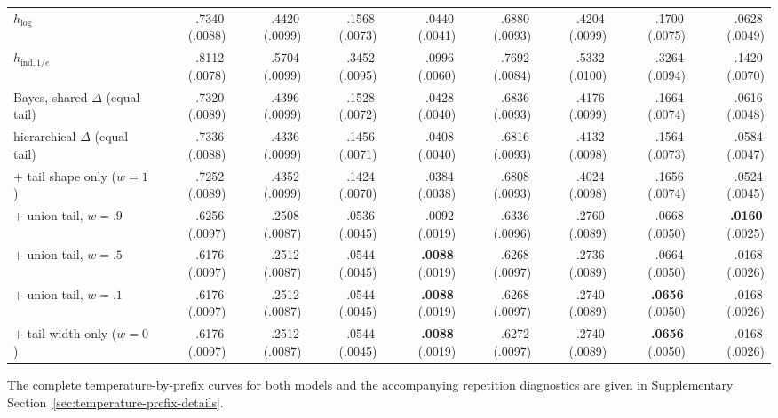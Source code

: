 \documentclass[11pt]{article}
\newcommand{\mcse}[2]{\mbox{#1\,{\fontsize{7}{8}\selectfont(#2)}}}
\newcommand{\bestmcse}[2]{\mbox{\textbf{#1}\,{\fontsize{7}{8}\selectfont(#2)}}}
\begin{document}
\begin{table}[htbp]
\begin{tabular}{@{}lrrrrrrrr@{}}
$h_{\log}$ & \mcse{.7340}{.0088} & \mcse{.4420}{.0099} & \mcse{.1568}{.0073} & \mcse{.0440}{.0041} & \mcse{.6880}{.0093} & \mcse{.4204}{.0099} & \mcse{.1700}{.0075} & \mcse{.0628}{.0049} \\
$h_{\mathrm{ind},1/e}$ & \mcse{.8112}{.0078} & \mcse{.5704}{.0099} & \mcse{.3452}{.0095} & \mcse{.0996}{.0060} & \mcse{.7692}{.0084} & \mcse{.5332}{.0100} & \mcse{.3264}{.0094} & \mcse{.1420}{.0070} \\
\addlinespace
Bayes, shared $\Delta$ (equal tail) & \mcse{.7320}{.0089} & \mcse{.4396}{.0099} & \mcse{.1528}{.0072} & \mcse{.0428}{.0040} & \mcse{.6836}{.0093} & \mcse{.4176}{.0099} & \mcse{.1664}{.0074} & \mcse{.0616}{.0048} \\
\quad hierarchical $\Delta$ (equal tail) & \mcse{.7336}{.0088} & \mcse{.4336}{.0099} & \mcse{.1456}{.0071} & \mcse{.0408}{.0040} & \mcse{.6816}{.0093} & \mcse{.4132}{.0098} & \mcse{.1564}{.0073} & \mcse{.0584}{.0047} \\
\quad $+$ tail shape only ($w=1$) & \mcse{.7252}{.0089} & \mcse{.4352}{.0099} & \mcse{.1424}{.0070} & \mcse{.0384}{.0038} & \mcse{.6808}{.0093} & \mcse{.4024}{.0098} & \mcse{.1656}{.0074} & \mcse{.0524}{.0045} \\
\quad $+$ union tail, $w=.9$ & \mcse{.6256}{.0097} & \mcse{.2508}{.0087} & \mcse{.0536}{.0045} & \mcse{.0092}{.0019} & \mcse{.6336}{.0096} & \mcse{.2760}{.0089} & \mcse{.0668}{.0050} & \bestmcse{.0160}{.0025} \\
\quad $+$ union tail, $w=.5$ & \mcse{.6176}{.0097} & \mcse{.2512}{.0087} & \mcse{.0544}{.0045} & \bestmcse{.0088}{.0019} & \mcse{.6268}{.0097} & \mcse{.2736}{.0089} & \mcse{.0664}{.0050} & \mcse{.0168}{.0026} \\
\quad $+$ union tail, $w=.1$ & \mcse{.6176}{.0097} & \mcse{.2512}{.0087} & \mcse{.0544}{.0045} & \bestmcse{.0088}{.0019} & \mcse{.6268}{.0097} & \mcse{.2740}{.0089} & \bestmcse{.0656}{.0050} & \mcse{.0168}{.0026} \\
\quad $+$ tail width only ($w=0$) & \mcse{.6176}{.0097} & \mcse{.2512}{.0087} & \mcse{.0544}{.0045} & \bestmcse{.0088}{.0019} & \mcse{.6272}{.0097} & \mcse{.2740}{.0089} & \bestmcse{.0656}{.0050} & \mcse{.0168}{.0026} \\
\bottomrule
\end{tabular}
\end{table}

The complete temperature-by-prefix curves for both models and the accompanying
repetition diagnostics are given in Supplementary
Section~\ref{sec:temperature-prefix-details}.
\end{document}
